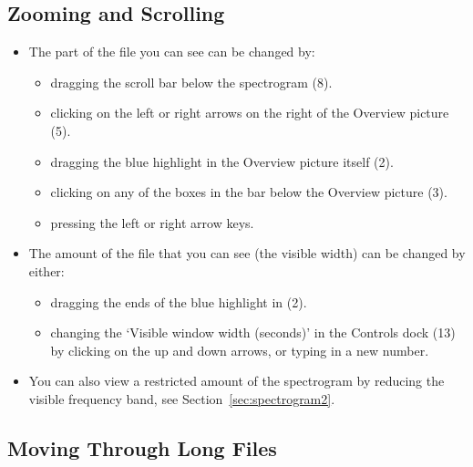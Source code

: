 \documentclass{article}
\begin{document}
\subsection{Zooming and Scrolling}

\begin{itemize}
\item The part of the file you can see can be changed by:
	\begin{itemize}
	\item dragging the scroll bar below the spectrogram (8).
	\item clicking on the left or right arrows on the right of the Overview picture (5).
	\item dragging the blue highlight in the Overview picture itself (2). 
	\item clicking on any of the boxes in the bar below the Overview picture (3).
	\item pressing the left or right arrow keys.
	\end{itemize}
	
\item The amount of the file that you can see (the visible width) can be changed by either: 
	\begin{itemize}
	\item dragging the ends of the blue highlight in (2).
	\item changing the `Visible window width (seconds)' in the Controls dock (13) by clicking on the up and down arrows, or typing in a new number.
	\end{itemize}

\item You can also view a restricted amount of the spectrogram by reducing the visible frequency band, see Section~\ref{sec:spectrogram2}. 
\end{itemize}

\subsection{Moving Through Long Files}
\end{document}
